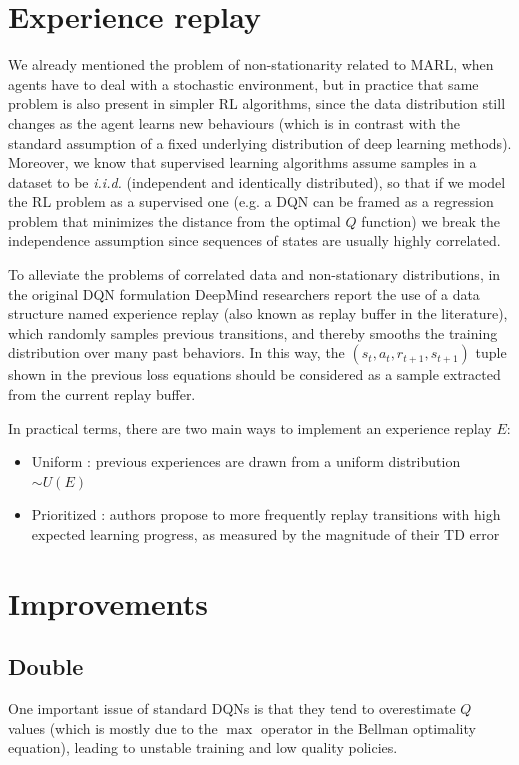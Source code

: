 \documentclass[a4paper,10pt]{report}
\begin{document}
\section{Experience replay}
We already mentioned the problem of non-stationarity related to MARL, when agents have to deal with a stochastic environment, but in practice that same problem is also present in simpler RL algorithms, since the data distribution still changes as the agent learns new behaviours (which is in contrast with the standard assumption of a fixed underlying distribution of deep learning methods). Moreover, we know that supervised learning algorithms assume samples in a dataset to be \textit{i.i.d.} (independent and identically distributed), so that if we model the RL problem as a supervised one (e.g. a DQN can be framed as a regression problem that minimizes the distance from the optimal $Q$ function) we break the independence assumption since sequences of states are usually highly correlated. 

To alleviate the problems of correlated data and non-stationary distributions, in the original DQN formulation \cite{atari-dqn} DeepMind researchers report the use of a data structure named experience replay (also known as replay buffer in the literature), which randomly samples previous transitions, and thereby smooths the training distribution over many past behaviors. In this way, the $(s_t, a_t, r_{t+1}, s_{t+1})$ tuple shown in the previous loss equations should be considered as a sample extracted from the current replay buffer.

In practical terms, there are two main ways to implement an experience replay $E$:
\begin{itemize}
	\item Uniform \cite{atari-dqn}: previous experiences are drawn from a uniform distribution $\sim U(E)$
	\item Prioritized \cite{per}: authors propose to more frequently replay transitions with high expected learning progress, as measured by the magnitude of their TD error
\end{itemize}

\section{Improvements}\label{sec:dqn-improvements}
\subsection{Double}\label{subsec:double-dqn}
One important issue of standard DQNs is that they tend to overestimate $Q$ values (which is mostly due to the $\max$ operator in the Bellman optimality equation), leading to unstable training and low quality policies. 
\end{document}
